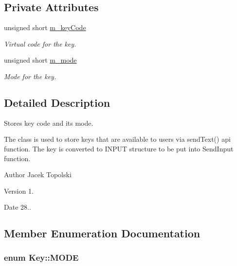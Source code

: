 \subsection*{Private Attributes}
\begin{DoxyCompactItemize}
\item 
unsigned short \hyperlink{class_key_ae6d7c00f3366108e2f45886797e0566d}{m\-\_\-key\-Code}
\begin{DoxyCompactList}\small\item\em Virtual code for the key. \end{DoxyCompactList}\item 
unsigned short \hyperlink{class_key_a6e6fc320c7ab65b829317223f357d706}{m\-\_\-mode}
\begin{DoxyCompactList}\small\item\em Mode for the key. \end{DoxyCompactList}\end{DoxyCompactItemize}


\subsection{Detailed Description}
Stores key code and its mode. 

The class is used to store keys that are available to users via send\-Text() api function. The key is converted to I\-N\-P\-U\-T structure to be put into Send\-Input function. \begin{DoxyAuthor}{Author}
Jacek Topolski 
\end{DoxyAuthor}
\begin{DoxyVersion}{Version}
1. 
\end{DoxyVersion}
\begin{DoxyDate}{Date}
28.. 
\end{DoxyDate}


\subsection{Member Enumeration Documentation}
\hypertarget{class_key_a6f8c4beba5584878553ee5b3077be416}{
\subsubsection[{M\-O\-D\-E}]{\setlength{\rightskip}{0pt plus 5cm}enum {\bf Key\-::\-M\-O\-D\-E}}}\label{class_key_a6f8c4beba5584878553ee5b3077be416}


